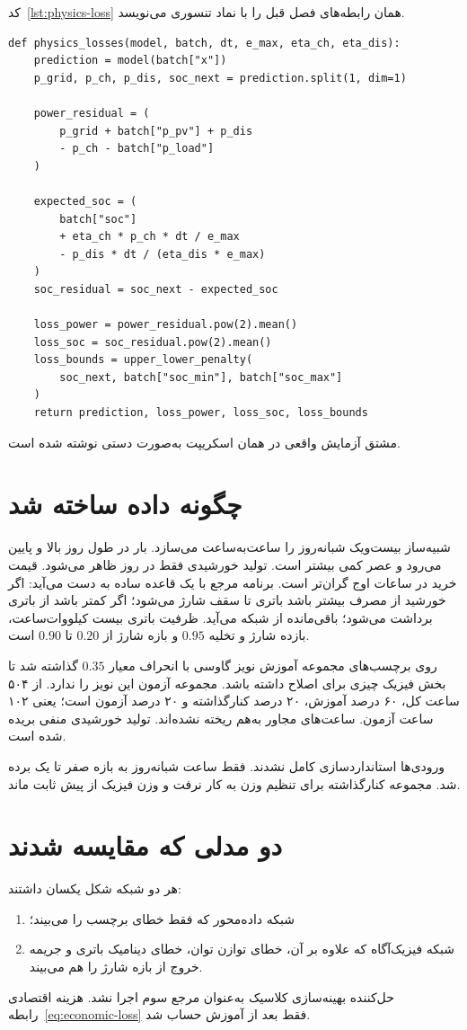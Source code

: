 کد~\ref{lst:physics-loss} همان رابطه‌های فصل قبل را با نماد تنسوری می‌نویسد.

\begin{latin}
\begin{lstlisting}[caption={\protect\lr{Power and battery residuals}},label={lst:physics-loss}]
def physics_losses(model, batch, dt, e_max, eta_ch, eta_dis):
    prediction = model(batch["x"])
    p_grid, p_ch, p_dis, soc_next = prediction.split(1, dim=1)

    power_residual = (
        p_grid + batch["p_pv"] + p_dis
        - p_ch - batch["p_load"]
    )

    expected_soc = (
        batch["soc"]
        + eta_ch * p_ch * dt / e_max
        - p_dis * dt / (eta_dis * e_max)
    )
    soc_residual = soc_next - expected_soc

    loss_power = power_residual.pow(2).mean()
    loss_soc = soc_residual.pow(2).mean()
    loss_bounds = upper_lower_penalty(
        soc_next, batch["soc_min"], batch["soc_max"]
    )
    return prediction, loss_power, loss_soc, loss_bounds
\end{lstlisting}
\end{latin}

مشتق آزمایش واقعی در همان اسکریپت  به‌صورت دستی نوشته شده است.

\section{چگونه داده ساخته شد}
شبیه‌ساز بیست‌ویک شبانه‌روز را ساعت‌به‌ساعت می‌سازد. بار در طول روز بالا و پایین می‌رود و عصر کمی بیشتر است. تولید خورشیدی فقط در روز ظاهر می‌شود. قیمت خرید در ساعات اوج گران‌تر است. برنامه مرجع با یک قاعده ساده به دست می‌آید: اگر خورشید از مصرف بیشتر باشد باتری تا سقف شارژ می‌شود؛ اگر کمتر باشد از باتری برداشت می‌شود؛ باقی‌مانده از شبکه می‌آید. ظرفیت باتری بیست کیلووات‌ساعت، بازده شارژ و تخلیه $0.95$ و بازه شارژ از $0.20$ تا $0.90$ است.

روی برچسب‌های مجموعه آموزش نویز گاوسی با انحراف معیار $0.35$ گذاشته شد تا بخش فیزیک چیزی برای اصلاح داشته باشد. مجموعه آزمون این نویز را ندارد. از ۵۰۴ ساعت کل، ۶۰ درصد آموزش، ۲۰ درصد کنارگذاشته و ۲۰ درصد آزمون است؛ یعنی ۱۰۲ ساعت آزمون. ساعت‌های مجاور به‌هم ریخته نشده‌اند. تولید خورشیدی منفی بریده شده است.

ورودی‌ها استانداردسازی کامل نشدند. فقط ساعت شبانه‌روز به بازه صفر تا یک برده شد. مجموعه کنارگذاشته برای تنظیم وزن به کار نرفت و وزن فیزیک از پیش ثابت ماند.

\section{دو مدلی که مقایسه شدند}
هر دو شبکه شکل یکسان داشتند:
\begin{enumerate}
  \item شبکه داده‌محور که فقط خطای برچسب را می‌بیند؛
  \item شبکه فیزیک‌آگاه که علاوه بر آن، خطای توازن توان، خطای دینامیک باتری و جریمه خروج از بازه شارژ را هم می‌بیند.
\end{enumerate}
حل‌کننده بهینه‌سازی کلاسیک به‌عنوان مرجع سوم اجرا نشد. هزینه اقتصادی رابطه~\eqref{eq:economic-loss} فقط بعد از آموزش حساب شد.

